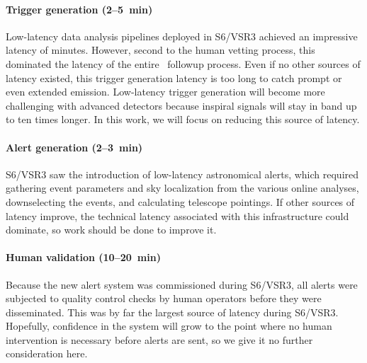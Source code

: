 \paragraph{Trigger generation (2--5~min)}%
Low-latency data analysis pipelines
deployed in S6/VSR3 achieved an impressive latency of minutes.  However, second
to the human vetting process, this dominated the latency of the entire \EM\
followup process.  Even if no other sources of latency existed, this trigger
generation latency is too long to catch prompt or even extended emission.
Low-latency trigger generation will become more challenging with advanced detectors
because inspiral signals will stay in band up to ten times longer.  In this work,
we will focus on reducing this source of latency.

\paragraph{Alert generation (2--3~min)}%
S6/VSR3 saw the introduction of low-latency astronomical
alerts, which required gathering event parameters and sky localization from the
various online analyses, downselecting the events, and calculating telescope pointings.
If other sources of latency improve, the technical latency associated with this
infrastructure could dominate, so work should be done to improve it.

\paragraph{Human validation (10--20~min)}%
Because the new alert system was commissioned during S6/VSR3, all alerts were subjected
to quality control checks by human operators before they were disseminated.
This was by far the largest source of latency during S6/VSR3.
Hopefully, confidence in the system will grow to the point where no human intervention
is necessary before alerts are sent, so we give it no further consideration here.

\paragraph{}

